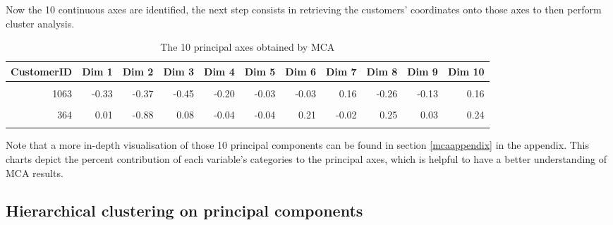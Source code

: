 \documentclass[
]{book}
\begin{document}
Now the 10 continuous axes are identified, the next step consists in retrieving the customers' coordinates onto those axes to then perform cluster analysis.

\begin{table}[H]

\caption{\label{tab:unnamed-chunk-26}The 10 principal axes obtained by MCA}
\centering
\begin{tabular}[t]{rrrrrrrrrrr}
\toprule
CustomerID & Dim 1 & Dim 2 & Dim 3 & Dim 4 & Dim 5 & Dim 6 & Dim 7 & Dim 8 & Dim 9 & Dim 10\\
\midrule
\cellcolor{gray!6}{854} & \cellcolor{gray!6}{-0.13} & \cellcolor{gray!6}{-0.44} & \cellcolor{gray!6}{-0.29} & \cellcolor{gray!6}{-0.20} & \cellcolor{gray!6}{-0.02} & \cellcolor{gray!6}{0.00} & \cellcolor{gray!6}{0.25} & \cellcolor{gray!6}{-0.15} & \cellcolor{gray!6}{-0.14} & \cellcolor{gray!6}{-0.07}\\
1063 & -0.33 & -0.37 & -0.45 & -0.20 & -0.03 & -0.03 & 0.16 & -0.26 & -0.13 & 0.16\\
\cellcolor{gray!6}{2454} & \cellcolor{gray!6}{0.59} & \cellcolor{gray!6}{0.37} & \cellcolor{gray!6}{0.09} & \cellcolor{gray!6}{-0.16} & \cellcolor{gray!6}{-0.47} & \cellcolor{gray!6}{0.11} & \cellcolor{gray!6}{-0.07} & \cellcolor{gray!6}{-0.39} & \cellcolor{gray!6}{0.24} & \cellcolor{gray!6}{-0.06}\\
364 & 0.01 & -0.88 & 0.08 & -0.04 & -0.04 & 0.21 & -0.02 & 0.25 & 0.03 & 0.24\\
\cellcolor{gray!6}{3606} & \cellcolor{gray!6}{-0.65} & \cellcolor{gray!6}{-0.02} & \cellcolor{gray!6}{0.05} & \cellcolor{gray!6}{0.58} & \cellcolor{gray!6}{0.08} & \cellcolor{gray!6}{-0.13} & \cellcolor{gray!6}{-0.03} & \cellcolor{gray!6}{0.01} & \cellcolor{gray!6}{-0.38} & \cellcolor{gray!6}{-0.09}\\
\bottomrule
\end{tabular}
\end{table}

Note that a more in-depth visualisation of those 10 principal components can be found in section \ref{mcaappendix} in the appendix. This charts depict the percent contribution of each variable's categories to the principal axes, which is helpful to have a better understanding of MCA results.

\hypertarget{hierarchical-clustering-on-principal-components}{%
\subsection{Hierarchical clustering on principal components}\label{hierarchical-clustering-on-principal-components}}
\end{document}
